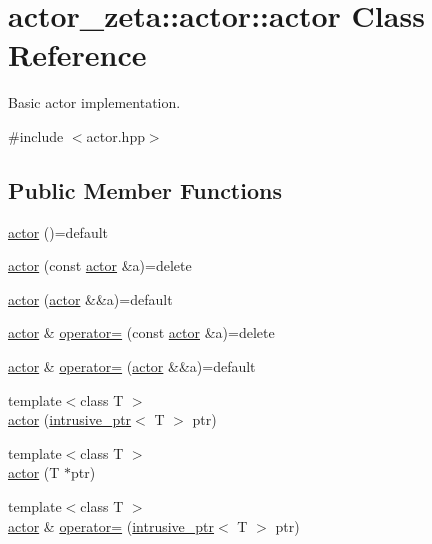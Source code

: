 \hypertarget{classactor__zeta_1_1actor_1_1actor}{}\section{actor\+\_\+zeta\+:\+:actor\+:\+:actor Class Reference}
\label{classactor__zeta_1_1actor_1_1actor}


Basic actor implementation.  




{\ttfamily \#include $<$actor.\+hpp$>$}

\subsection*{Public Member Functions}
\begin{DoxyCompactItemize}
\item 
\hyperlink{classactor__zeta_1_1actor_1_1actor_a7ec6ba681de874c0ffc40f81706387ab}{actor} ()=default
\item 
\hyperlink{classactor__zeta_1_1actor_1_1actor_a56decfd3d1d91fdfc6179189a4f558b3}{actor} (const \hyperlink{classactor__zeta_1_1actor_1_1actor}{actor} \&a)=delete
\item 
\hyperlink{classactor__zeta_1_1actor_1_1actor_a9cfa98421bd8eed8fe16c7de6782622a}{actor} (\hyperlink{classactor__zeta_1_1actor_1_1actor}{actor} \&\&a)=default
\item 
\hyperlink{classactor__zeta_1_1actor_1_1actor}{actor} \& \hyperlink{classactor__zeta_1_1actor_1_1actor_a00a3e4d947b09fc376b69d2f122d46b9}{operator=} (const \hyperlink{classactor__zeta_1_1actor_1_1actor}{actor} \&a)=delete
\item 
\hyperlink{classactor__zeta_1_1actor_1_1actor}{actor} \& \hyperlink{classactor__zeta_1_1actor_1_1actor_a8b49fc68d207e728493643678abe5329}{operator=} (\hyperlink{classactor__zeta_1_1actor_1_1actor}{actor} \&\&a)=default
\item 
{\footnotesize template$<$class T $>$ }\\\hyperlink{classactor__zeta_1_1actor_1_1actor_a34cf041d9a42b0ec60a6021a9e5858fc}{actor} (\hyperlink{classactor__zeta_1_1intrusive__ptr}{intrusive\+\_\+ptr}$<$ T $>$ ptr)
\item 
{\footnotesize template$<$class T $>$ }\\\hyperlink{classactor__zeta_1_1actor_1_1actor_aac0d60ab708b9524c8cd1ca22060c8ad}{actor} (T $\ast$ptr)
\item 
{\footnotesize template$<$class T $>$ }\\\hyperlink{classactor__zeta_1_1actor_1_1actor}{actor} \& \hyperlink{classactor__zeta_1_1actor_1_1actor_aaa3ce62db27a8dbd20be3e2a1c997bff}{operator=} (\hyperlink{classactor__zeta_1_1intrusive__ptr}{intrusive\+\_\+ptr}$<$ T $>$ ptr)

\end{DoxyCompactItemize}
